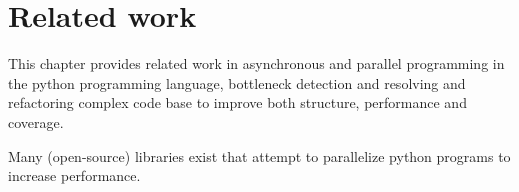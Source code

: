 \chapter*{Related work}

This chapter provides related work in asynchronous and parallel programming in the python programming language, bottleneck detection and resolving and refactoring complex code base to improve both structure, performance and coverage.

Many (open-source) libraries exist that attempt to parallelize python programs to increase performance.
